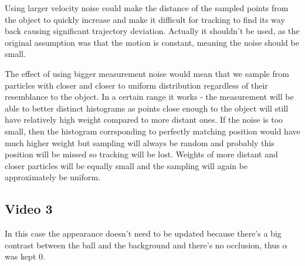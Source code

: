 \documentclass[10pt,a4paper,twoside]{article}
\begin{document}
Using larger velocity noise could make the distance of the sampled points from
the object to quickly increase and make it difficult for tracking to find its
way back causing significant trajectory deviation. Actually it shouldn't be used, as the
original assumption was that the motion is constant, meaning the noise should be
small.

The effect of using bigger measurement noise would mean that we sample from particles with closer and closer to uniform distribution regardless of their resemblance to the object.
In a certain range it works - the measurement will be able to better distinct histograms as points close enough to the object will still have
relatively high weight compared to more distant ones. If the noise is too small, then the histogram corrsponding to perfectly matching position
would have much higher weight but sampling will always be random and probably this position will be missed so tracking will be
lost. Weights of more distant and closer particles will be equally small and the
sampling will again be approximately be uniform.



\subsection{Video 3}
In this case the appearance doesn't need to be updated because there's a big
contrast between the ball and the background and there's no occlusion, thus
$\alpha$ was kept 0.
\end{document}
